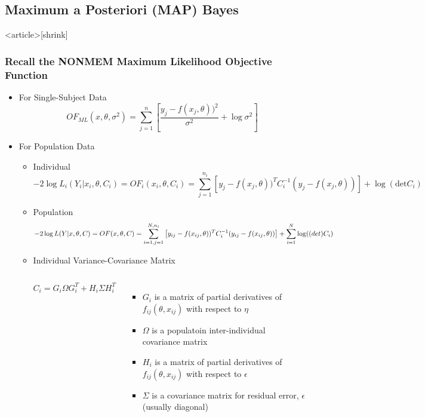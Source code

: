 \documentclass{beamer}
\begin{document}
\subsection{Maximum a Posteriori (MAP) Bayes}




\begin{frame}<article>[shrink]
  \frametitle{\large Recall the NONMEM Maximum Likelihood Objective Function}

  \begin{itemize}
  \item For Single-Subject Data
$$OF_{ML}(x,\theta,\sigma^2) = \sum_{j=1}^{n}\left[\frac{y_j - f(x_j,\theta))^2}{\sigma^2} + \log\sigma^2\right]$$
\item For Population Data
  \begin{itemize}
  \item Individual
$$ -2\log L_i(Y_i|x_i,\theta,C_i) = OF_i(x_i,\theta,C_i) = \sum_{j=1}^{n_i}\left[y_j - f(x_j,\theta))^TC_i^{-1}(y_j-f(x_j,\theta))\right]+\log(\text{det}C_i)$$
\item Population
$$ -2\log L(Y|x,\theta,C) = OF(x,\theta,C) = \sum_{i=1,j=1}^{N,n_i}\left[y_{ij}-f(x_{ij},\theta))^TC_i^{-1}(y_{ij}-f(x_{ij},\theta))\right] + \sum_{i=1}^N\log(\text(det)C_i) $$
\item Individual Variance-Covariance Matrix
\begin{columns}
$$ C_i = G_i\Omega G_i^T + H_i\Sigma H_i^T$$
\begin{itemize}
\item $G_i$ is a matrix of partial derivatives of
  $f_{ij}(\theta,x_{ij})$ with respect to $\eta$
\item $\Omega$ is a populatoin inter-individual covariance matrix
\item $H_i$ is a matrix of partial derivatives of
  $f_{ij}(\theta, x_{ij})$ with respect to $\epsilon$
\item $\Sigma$ is a covariance matrix for residual error, $\epsilon$
  (usually diagonal)
\end{itemize}
\end{columns}
\end{itemize}
\end{itemize}

\end{frame}
\end{document}

